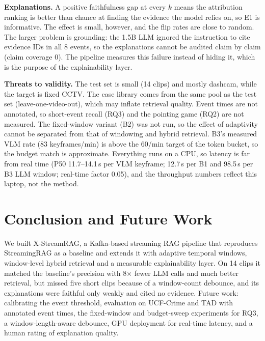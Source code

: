 \documentclass[conference]{IEEEtran}
\begin{document}
\textbf{Explanations.} A positive faithfulness gap at every $k$ means the attribution ranking is better than
chance at finding the evidence the model relies on, so E1 is informative. The effect is small, however, and
the flip rates are close to random. The larger problem is grounding: the 1.5B LLM ignored the instruction to
cite evidence IDs in all 8 events, so the explanations cannot be audited claim by claim (claim coverage 0).
The pipeline measures this failure instead of hiding it, which is the purpose of the explainability layer.

\textbf{Threats to validity.} The test set is small (14 clips) and mostly dashcam, while the target is fixed
CCTV. The case library comes from the same pool as the test set (leave-one-video-out), which may inflate
retrieval quality. Event times are not annotated, so short-event recall (RQ3) and the pointing game (RQ2)
are not measured. The fixed-window variant (B2) was not run, so the effect of adaptivity cannot be separated
from that of windowing and hybrid retrieval. B3's measured VLM rate (83 keyframes/min) is above the
60/min target of the token bucket, so the budget match is approximate. Everything runs on a CPU, so latency
is far from real time (P50 11.7--14.1\,s per VLM keyframe; 12.7\,s per B1 and 98.5\,s per B3 LLM window;
real-time factor 0.05), and the throughput numbers reflect this laptop, not the method.

\section{Conclusion and Future Work}
We built X-StreamRAG, a Kafka-based streaming RAG pipeline that reproduces StreamingRAG as a baseline and
extends it with adaptive temporal windows, window-level hybrid retrieval and a measurable explainability
layer. On 14 clips it matched the baseline's precision with 8$\times$ fewer LLM calls and much better retrieval,
but missed five short clips because of a window-count debounce, and its explanations were faithful only
weakly and cited no evidence. Future work: calibrating the event threshold, evaluation on UCF-Crime and TAD with annotated event
times, the fixed-window and budget-sweep experiments for RQ3, a window-length-aware debounce, GPU
deployment for real-time latency, and a human rating of explanation quality.
\end{document}
